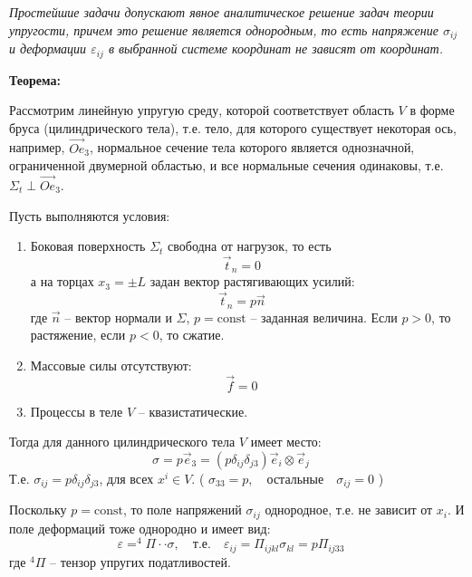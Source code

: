 

\textit{Простейшие задачи допускают явное аналитическое решение задач теории упругости, причем это решение является однородным, то есть напряжение \( \sigma_{ij} \) и деформации \( \varepsilon_{ij} \) в выбранной системе координат не зависят от координат.
}
\par
\textbf{Теорема:}

Рассмотрим линейную упругую среду, которой соответствует область \( V \) в форме бруса (цилиндрического тела), т.е. тело, для которого существует некоторая ось, например, \( \vec{Oe}_3 \), нормальное сечение тела которого является однозначной, ограниченной двумерной областью, и все нормальные сечения одинаковы, т.е. \( \Sigma_t \perp \vec{Oe}_3 \).

Пусть выполняются условия:
\begin{enumerate}
    \item Боковая поверхность \( \Sigma_t \) свободна от нагрузок, то есть
\begin{equation}
\vec{t}_n = 0 \quad \label{eq:(261)}
\end{equation}
а на торцах \( x_3 = \pm L \) задан вектор растягивающих усилий:
\begin{equation}
\vec{t}_n = p \vec{n} \quad \label{eq:(262)}
\end{equation}
где \( \vec{n} \) – вектор нормали и \( \Sigma \), \( p = \text{const} \) – заданная величина.
Если \( p > 0 \), то растяжение, если \( p < 0 \), то сжатие.
\item Массовые силы отсутствуют:
\begin{equation}
\vec{f} = 0 \quad \label{eq:(263)}
\end{equation}
\item Процессы в теле \( V \) – квазистатические.
\end{enumerate}

Тогда для данного цилиндрического тела \( V \) имеет место:
\begin{equation}
\sigma = p \vec{e}_3 = \left( p \delta_{ij} \delta_{j3} \right) \vec{e}_i \otimes \vec{e}_j \quad \label{eq:(264)}
\end{equation}
Т.е. \( \sigma_{ij} = p \delta_{ij} \delta_{j3} \), для всех \( x^i \in V \).
(
$\sigma_{33} = p, \quad \text{остальные} \quad \sigma_{ij} = 0$
)

Поскольку \( p = \text{const} \), то поле напряжений \( \sigma_{ij} \) однородное, т.е. не зависит от \( x_i \). И поле деформаций тоже однородно и имеет вид:
\begin{equation}
\varepsilon = ^4\Pi \cdot\cdot \sigma, \quad \text{т.е.} \quad \varepsilon_{ij} = \Pi _{ijkl} \sigma_{kl} = p \Pi _{ij33} \quad \label{eq:(265)}
\end{equation}
где \( ^4\Pi\) – тензор упругих податливостей.

